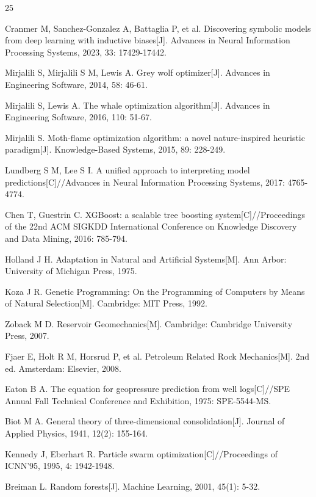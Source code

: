 \documentclass[a4paper,12pt]{ctexart}
\begin{document}
\begin{thebibliography}{25}

Cranmer M, Sanchez-Gonzalez A, Battaglia P, et al. Discovering symbolic models from deep learning with inductive biases[J]. Advances in Neural Information Processing Systems, 2023, 33: 17429-17442.

Mirjalili S, Mirjalili S M, Lewis A. Grey wolf optimizer[J]. Advances in Engineering Software, 2014, 58: 46-61.

Mirjalili S, Lewis A. The whale optimization algorithm[J]. Advances in Engineering Software, 2016, 110: 51-67.

Mirjalili S. Moth-flame optimization algorithm: a novel nature-inspired heuristic paradigm[J]. Knowledge-Based Systems, 2015, 89: 228-249.

Lundberg S M, Lee S I. A unified approach to interpreting model predictions[C]//Advances in Neural Information Processing Systems, 2017: 4765-4774.

Chen T, Guestrin C. XGBoost: a scalable tree boosting system[C]//Proceedings of the 22nd ACM SIGKDD International Conference on Knowledge Discovery and Data Mining, 2016: 785-794.

Holland J H. Adaptation in Natural and Artificial Systems[M]. Ann Arbor: University of Michigan Press, 1975.

Koza J R. Genetic Programming: On the Programming of Computers by Means of Natural Selection[M]. Cambridge: MIT Press, 1992.

Zoback M D. Reservoir Geomechanics[M]. Cambridge: Cambridge University Press, 2007.

Fjaer E, Holt R M, Horsrud P, et al. Petroleum Related Rock Mechanics[M]. 2nd ed. Amsterdam: Elsevier, 2008.

Eaton B A. The equation for geopressure prediction from well logs[C]//SPE Annual Fall Technical Conference and Exhibition, 1975: SPE-5544-MS.

Biot M A. General theory of three-dimensional consolidation[J]. Journal of Applied Physics, 1941, 12(2): 155-164.

Kennedy J, Eberhart R. Particle swarm optimization[C]//Proceedings of ICNN'95, 1995, 4: 1942-1948.

Breiman L. Random forests[J]. Machine Learning, 2001, 45(1): 5-32.


\end{thebibliography}
\end{document}
